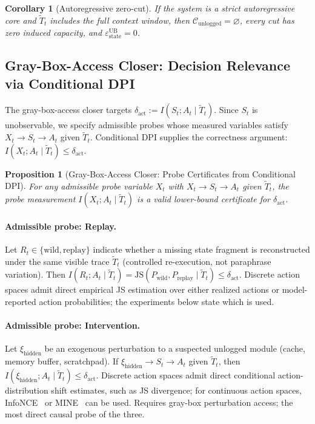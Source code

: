 \documentclass{article}
\newtheorem{proposition}{Proposition}
\newtheorem{corollary}{Corollary}
\begin{document}
\begin{corollary}[Autoregressive zero-cut]
\label{cor:auto-exact}
If the system is a strict autoregressive core and $\tilde T_t$ includes the full context window, then $\mathcal{C}_\text{unlogged} = \varnothing$, every cut has zero induced capacity, and $\varepsilon_\text{state}^\text{UB} = 0$.
\end{corollary}

\subsection{Gray-Box-Access Closer: Decision Relevance via Conditional DPI}
\label{sec:dynamic-cert}

The gray-box-access closer targets $\delta_\text{act} := I(S_t; A_t \mid \tilde T_t)$. Since $S_t$ is unobservable, we specify admissible probes whose measured variables satisfy $X_t \to S_t \to A_t$ given $\tilde T_t$. Conditional DPI supplies the correctness argument: $I(X_t; A_t \mid \tilde T_t) \leq \delta_\text{act}$.

\begin{proposition}[Gray-Box-Access Closer: Probe Certificates from Conditional DPI]
\label{prop:dynamic-lb}
For any admissible probe variable $X_t$ with $X_t \to S_t \to A_t$ given $\tilde T_t$, the probe measurement $I(X_t; A_t \mid \tilde T_t)$ is a valid lower-bound certificate for $\delta_\text{act}$.
\end{proposition}

\paragraph{Admissible probe: Replay.}
\label{sec:replay-cert}
Let $R_t \in \{\text{wild}, \text{replay}\}$ indicate whether a missing state fragment is reconstructed under the same visible trace $\tilde T_t$ (controlled re-execution, not paraphrase variation). Then $I(R_t; A_t \mid \tilde T_t) = \mathrm{JS}(P_\text{wild}, P_\text{replay} \mid \tilde T_t) \leq \delta_\text{act}$.  Discrete action spaces admit direct empirical JS estimation over either realized actions or model-reported action probabilities; the experiments below state which is used.

\paragraph{Admissible probe: Intervention.}
Let $\xi_\text{hidden}$ be an exogenous perturbation to a suspected unlogged module (cache, memory buffer, scratchpad). If $\xi_\text{hidden} \to S_t \to A_t$ given $\tilde T_t$, then $I(\xi_\text{hidden}; A_t \mid \tilde T_t) \leq \delta_\text{act}$. Discrete action spaces admit direct conditional action-distribution shift estimates, such as JS divergence; for continuous action spaces, InfoNCE~\citep{oord2018cpc} or MINE~\citep{belghazi2018mine} can be used. Requires gray-box perturbation access; the most direct causal probe of the three.
\end{document}
